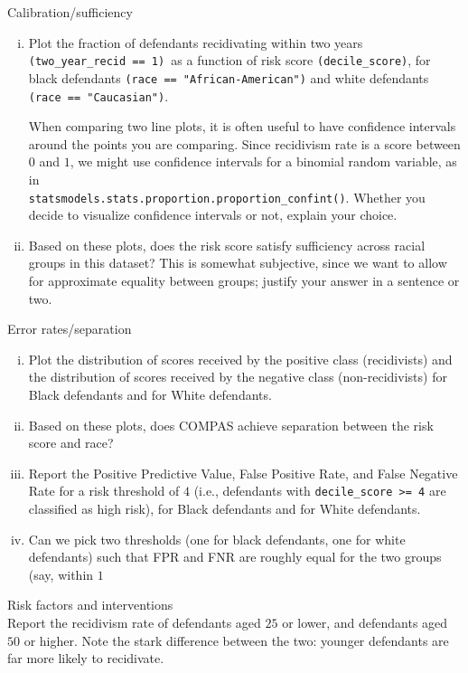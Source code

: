 \documentclass[preview]{standalone}
\begin{document}
\begin{Parts}

\Part Calibration/sufficiency
\begin{enumerate}[(i)]
\item Plot the fraction of defendants recidivating within two years \texttt{(two\_year\_recid == 1) }as a function of risk score \texttt{(decile\_score)}, for black defendants \texttt{(race == "African-American")} and white defendants \texttt{(race == "Caucasian")}.

When comparing two line plots, it is often useful to have confidence intervals around the points you are comparing. Since recidivism rate is a score between $0$ and $1$, we might use confidence intervals for a binomial random variable, as in \\
\texttt{statsmodels.stats.proportion.proportion\_confint()}. Whether you decide to visualize confidence intervals or not, explain your choice.




\item Based on these plots, does the risk score satisfy sufficiency across racial groups in this dataset? This is somewhat subjective, since we want to allow for approximate equality between groups; justify your answer in a sentence or two.



\end{enumerate}


\Part Error rates/separation
\begin{enumerate}[(i)]
\item Plot the distribution of scores received by the positive class (recidivists) and the distribution of scores received by the negative class (non-recidivists) for Black defendants and for White defendants.



\item Based on these plots, does COMPAS achieve separation between the risk score and race?

\item Report the Positive Predictive Value, False Positive Rate, and False Negative Rate for a risk threshold of $4$ (i.e., defendants with \texttt{decile\_score >= 4} are classified as high risk), for Black defendants and for White defendants.




\item Can we pick two thresholds (one for black defendants, one for white defendants) such that FPR and FNR are roughly equal for the two groups (say, within $1$\


\end{enumerate}


\Part Risk factors and interventions \\
Report the recidivism rate of defendants aged $25$ or lower, and defendants aged $50$ or higher. Note the stark difference between the two: younger defendants are far more likely to recidivate. \\


\end{Parts}
\end{document}

